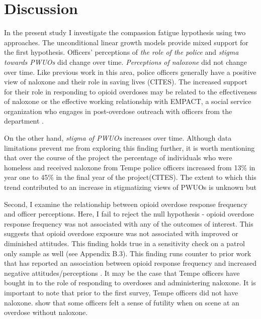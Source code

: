 \section{Discussion}

In the present study I investigate the compassion fatigue hypothesis using two approaches. The unconditional linear growth models provide mixed support for the first hypothesis. Officers' perceptions of \textit{the role of the police} and \textit{stigma towards PWUOs} did change over time. \textit{Perceptions of naloxone} did not change over time. Like previous work in this area, police officers generally have a positive view of naloxone and their role in saving lives (CITES). The increased support for their role in responding to opioid overdoses may be related to the effectiveness of naloxone \parencite{white_leveraging_2022} or the effective working relationship with EMPACT, a social service organization who engages in post-overdose outreach with officers from the department \parencite{white_moving_2021}. 

On the other hand, \textit{stigma of PWUOs} increases over time. Although data limitations prevent me from exploring this finding further, it is worth mentioning that over the course of the project the percentage of individuals who were homeless and received naloxone from Tempe police officers increased from 13\% in year one to 45\% in the final year of the project(CITES). The extent to which this trend contributed to an increase in stigmatizing views of PWUOs is unknown but %

Second, I examine the relationship between opioid overdose response frequency and officer perceptions. Here, I fail to reject the null hypothesis - opioid overdose response frequency was not associated with any of the outcomes of interest. This suggests that opioid overdose exposure was not associated with improved or diminished attitudes. This finding holds true in a sensitivity check on a patrol only sample as well (see Appendix B.3). This finding runs counter to prior work that has reported an association between opioid response frequency and increased negative attitudes/perceptions \textcite{carroll_knowledge_2020, murphy_police_2021}. It may be the case that Tempe officers have bought in to the role of responding to overdoses and administering naloxone. It is important to note that prior to the first survey, Tempe officers did not have naloxone. \textcite{white_moving_2021} show that some officers felt a sense of futility when on scene at an overdose without naloxone. 

